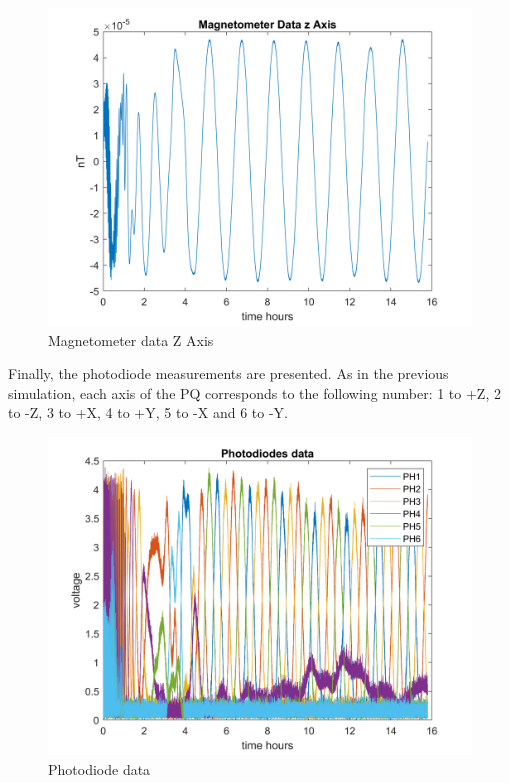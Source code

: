 \begin{itemize}
\begin{figure}[H]
        \begin{minipage}{0.32\linewidth}
            \centering
            \includegraphics[width=0.95\linewidth]{res/img/Nadir_EKF/Simulations/Magnetometer data Z Axis.png}
            \caption{Magnetometer data Z Axis}
            \label{fig:MagnetometerDataZ}
        \end{minipage}
    \end{figure}

    Finally, the photodiode measurements are presented. As in the previous simulation, each axis of the PQ corresponds to the following number: 1 to +Z, 2 to -Z, 3 to +X, 4 to +Y,
    5 to -X and 6 to -Y.
    \begin{figure}[H]
        \centering
        \includegraphics[width=0.7\linewidth]{res/img/Nadir_EKF/Simulations/Photodiode data.png}
        \caption{Photodiode data}
        \label{fig:PhotodiodeData}
    \end{figure}


\end{itemize}
